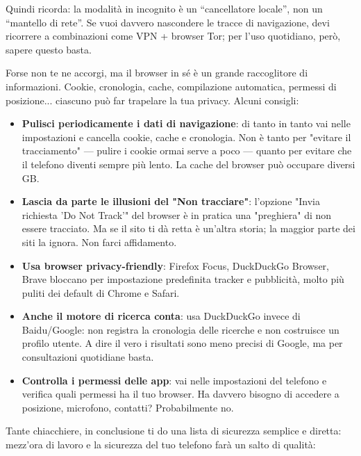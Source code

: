 Quindi ricorda: la modalità in incognito è un “cancellatore locale”, non un “mantello di rete”. Se vuoi davvero nascondere le tracce di navigazione, devi ricorrere a combinazioni come VPN + browser Tor; per l'uso quotidiano, però, sapere questo basta.


Forse non te ne accorgi, ma il browser in sé è un grande raccoglitore di informazioni. Cookie, cronologia, cache, compilazione automatica, permessi di posizione... ciascuno può far trapelare la tua privacy. Alcuni consigli:

\begin{itemize}
  \item \textbf{Pulisci periodicamente i dati di navigazione}: di tanto in tanto vai nelle impostazioni e cancella cookie, cache e cronologia. Non è tanto per "evitare il tracciamento" — pulire i cookie ormai serve a poco — quanto per evitare che il telefono diventi sempre più lento. La cache del browser può occupare diversi GB.
  \item \textbf{Lascia da parte le illusioni del "Non tracciare"}: l'opzione "Invia richiesta 'Do Not Track'" del browser è in pratica una "preghiera" di non essere tracciato. Ma se il sito ti dà retta è un'altra storia; la maggior parte dei siti la ignora. Non farci affidamento.
  \item \textbf{Usa browser privacy-friendly}: Firefox Focus, DuckDuckGo Browser, Brave bloccano per impostazione predefinita tracker e pubblicità, molto più puliti dei default di Chrome e Safari.
  \item \textbf{Anche il motore di ricerca conta}: usa DuckDuckGo invece di Baidu/Google: non registra la cronologia delle ricerche e non costruisce un profilo utente. A dire il vero i risultati sono meno precisi di Google, ma per consultazioni quotidiane basta.
  \item \textbf{Controlla i permessi delle app}: vai nelle impostazioni del telefono e verifica quali permessi ha il tuo browser. Ha davvero bisogno di accedere a posizione, microfono, contatti? Probabilmente no.
\end{itemize}


Tante chiacchiere, in conclusione ti do una lista di sicurezza semplice e diretta: mezz'ora di lavoro e la sicurezza del tuo telefono farà un salto di qualità:

